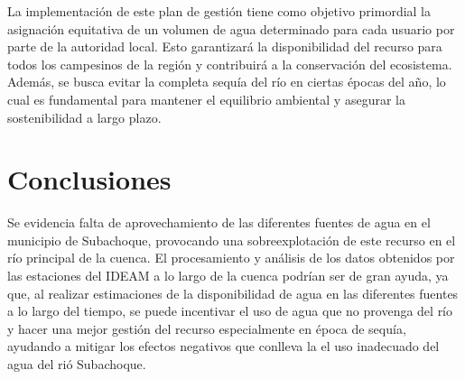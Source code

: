 \documentclass[draft]{agujournal2019}
\begin{document}
La implementación de este plan de gestión tiene como objetivo primordial la asignación equitativa de un volumen de agua determinado para cada usuario por parte de la autoridad local. Esto garantizará la disponibilidad del recurso para todos los campesinos de la región y contribuirá a la conservación del ecosistema. Además, se busca evitar la completa sequía del río en ciertas épocas del año, lo cual es fundamental para mantener el equilibrio ambiental y asegurar la sostenibilidad a largo plazo.

\section{Conclusiones}
Se evidencia falta de aprovechamiento de las diferentes fuentes de agua en el municipio de Subachoque, provocando una sobreexplotación de este recurso en el río principal de la cuenca. El procesamiento y análisis de los datos obtenidos por las estaciones del IDEAM a lo largo de la cuenca podrían ser de gran ayuda, ya que, al realizar estimaciones de la disponibilidad de agua en las diferentes fuentes a lo largo del tiempo, se puede incentivar el uso de agua que no provenga del río y hacer una mejor gestión del recurso especialmente en época de sequía, ayudando a mitigar los efectos negativos que conlleva la el uso inadecuado del agua del rió Subachoque. 





%
%



%
\end{document}
